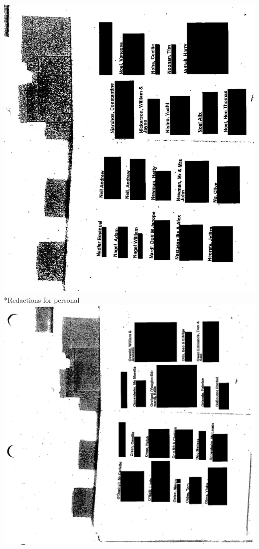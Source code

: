 \documentclass[10pt]{article}
\begin{document}
\includegraphics[max width=\textwidth, center]{2025_02_27_dd68c3d38de88f0516d9g-162(2)}\\
*Redactions for personal\\
\includegraphics[max width=\textwidth, center]{2025_02_27_dd68c3d38de88f0516d9g-163}\\
\end{document}
